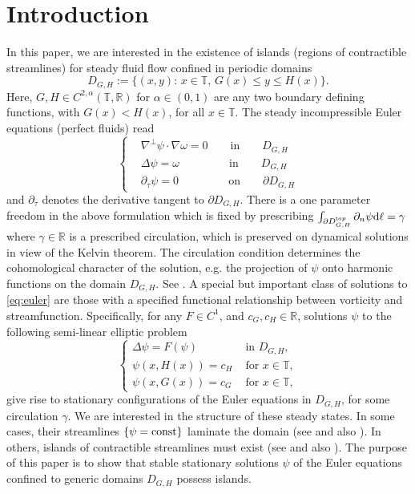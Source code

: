 \documentclass[11pt,reqno]{amsproc}
\newcommand{\R}{\mathbb{R}}
\newcommand{\rmd}{{\rm d}}
\numberwithin{equation}{section}
\numberwithin{theorem}{section}
\numberwithin{prop}{section}
\numberwithin{cor}{section}
\numberwithin{lemma}{section}
\theoremstyle{remark}
\theoremstyle{definition}
\begin{document}
\section{Introduction}
In this paper, we are interested in the existence of islands (regions of contractible streamlines) for steady fluid flow  confined in periodic domains
\begin{equation}
D_{G,H} := \lbrace (x,y)  : \, x\in \mathbb{T}, \, G(x) \leq y \leq H(x) \rbrace.
\end{equation}
Here, $G,H\in C^{2,\alpha}(\mathbb{T},\R)$ for $\alpha\in(0,1)$ are any two boundary defining functions, with $G(x) < H(x)$, for all $x\in \mathbb{T}$.
The steady incompressible Euler equations (perfect fluids) read
\begin{equation}\label{eq:euler}
\begin{cases}
&\nabla^\perp \psi\cdot \nabla \omega=0 \qquad \text{in} \qquad  D_{G,H} \\
&\Delta \psi =\omega \qquad \qquad \ \ \text{in} \qquad  D_{G,H}\\
&\partial_\tau \psi  = 0 \qquad \qquad\ \ \text{on} \qquad  \partial D_{G,H}
\end{cases}
\end{equation}
and $\partial_\tau$ denotes the derivative tangent to $\partial D_{G, H}$.
There is a one parameter freedom in the above formulation which is fixed by prescribing $\int_{\partial  D_{G,H}^{\mathsf top}} \partial_n \psi \rmd \ell = \gamma$ where  $\gamma \in \mathbb{R}$ is a prescribed circulation, which is preserved on dynamical solutions in view of the Kelvin theorem. The circulation condition determines the cohomological character of the solution, e.g. the projection of $\psi$ onto harmonic functions on the  domain $D_{G,H}$.    See \cite{drivas2023singularity}. A special but important class of solutions to  \eqref{eq:euler} are those with a specified functional relationship between vorticity and streamfunction.  Specifically, for any $F\in C^1$, and $c_G,c_H\in \R$, solutions $\psi$ to  the following semi-linear elliptic problem
\begin{equation}\label{eq:steadyEulerDve}
\begin{cases}
\Delta\psi = F(\psi) & \text{ in } D_{G,H}, \\
\psi(x,H(x))=c_H & \text{ for } x\in\mathbb{T}, \\
\psi(x,G(x))=c_G & \text{ for } x\in\mathbb{T},
\end{cases}
\end{equation}
give rise to stationary configurations of the Euler equations in $D_{G,H}$, for some circulation $\gamma$. 
We are interested in the structure of these steady states.  In some cases, their streamlines $\{\psi= {\rm const}\}$ laminate the domain (see \cite{CDG21} and also \cite{hamel2017shear, hamel2019liouville, HM23,drivas2024geometric}).  In others, islands of contractible streamlines must exist (see \cite{drivas2024islands} and also \cite{coti2023stationary, nualart2023zonal}).
The purpose of this paper is to show that stable stationary solutions $\psi$ of the Euler equations confined to generic domains $D_{G,H}$ possess islands. 
\end{document}

